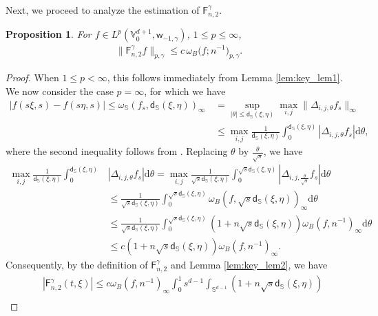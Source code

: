 \documentclass{amsart}
\newtheorem{prop}[thm]{Proposition}
\theoremstyle{remark}
\def\d{\mathrm{d}}
\def\g{{\gamma}}
\def\s{\sigma}
\def\SS{{\mathbb S}}
\def\VV{{\mathbb V}}
\def\d{\mathrm{d}}
\def\sF{{\mathsf F}}
\def\sL{{\mathsf L}}
\def\sb{{\mathsf b}}
\def\sd{{\mathsf d}}
\def\sw{{\mathsf w}}
\def\g{{\gamma}}
\def\s{\sigma}
\def\SS{{\mathbb S}}
\def\VV{{\mathbb V}}
\def\f{\frac}
\def\f{\frac}
\begin{document}
Next, we proceed to analyze the estimation of  $\sF_{n,2}^\g$.

\begin{prop}\label{prop:Fn2}
For $f \in L^p(\VV_0^{d+1}, \sw_{-1,\g})$, $1\le p \le \infty$, 
\begin{align*}
 \| \sF_{n,2}^\g f \|_{p,\g}  \le c \, \omega_B \big(f; n^{-1}\big)_{p,\g}.
\end{align*}
\end{prop}

\begin{proof}
When $1\leq p < \infty$, this follows immediately from Lemma \ref{lem:key_lem1}. We now
consider the case $p = \infty$, for which we have 
\begin{align*}
  |f(s\xi,s)-f(s\eta,s)|  \leq \omega_{\SS } (f_s, \sd_{\SS} (\xi,\eta))_{\infty} \, &
	 = \sup_{|\theta|\leq  \sd_{\SS} (\xi,\eta)} \max_{i,j}\|\Delta_{i,j,\theta} f_s\|_{\infty}  \\
	& \leq \max_{i,j}\frac{1}{ \sd_{\SS} (\xi,\eta)}\int_0^{ \sd_{\SS} (\xi,\eta)}  |\Delta_{i,j,\theta} f_s| \d \theta, 
\end{align*} 
where the second inequality follows from   \cite[Lemma 2.6(iv)]{DaiX2}. Replacing $\theta $ by $\f{\theta}{\sqrt{s}}$, we have 
\begin{align*}
	\max_{i,j}\frac{1}{ \sd_{\SS} (\xi,\eta)}\int_0^{ \sd_{\SS} (\xi,\eta)} &  |\Delta_{i,j,\theta} f_s| \d \theta 
  =   \max_{i,j}\frac{1}{ \sqrt{s}\sd_{\SS} (\xi,\eta)}\int_0^{ \sqrt{s}\sd_{\SS} (\xi,\eta)}  |\Delta_{i,j,\f{\theta}{\sqrt{s}}} f_s| \d \theta \\
 & \leq \frac{1}{ \sqrt{s}\sd_{\SS} (\xi,\eta)}\int_0^{ \sqrt{s}\sd_{\SS} (\xi,\eta)} 
      \omega_{B}(f, \sqrt{s}\sd_{\SS} (\xi,\eta))_{\infty} \d \theta
 \\& \leq \frac{1}{ \sqrt{s}\sd_{\SS} (\xi,\eta)}\int_0^{ \sqrt{s}\sd_{\SS} (\xi,\eta)} (1+n\sqrt{s}\sd_{\SS} (\xi,\eta))
    \omega_{B}(f, n^{-1})_{\infty} \d \theta  \\& \leq c(1+n \sqrt{s}\sd_{\SS} (\xi,\eta)) \omega_{B}(f, n^{-1})_{\infty}.  
\end{align*}
Consequently, by the   definition of $\sF_{n,2}^\g$ and Lemma \ref{lem:key_lem2}, we have  
\begin{align*}
	& \left | \sF_{n,2}^\gamma(t,\xi) \right | 
	 \le c  \omega_{B}(f, n^{-1})_{\infty}  \int_0^1s^{d-1}  \int_{\SS^{d-1}}  (1+n \sqrt{s}\sd_{\SS} (\xi,\eta)) \\

\end{align*}
\end{proof}
\end{document}
